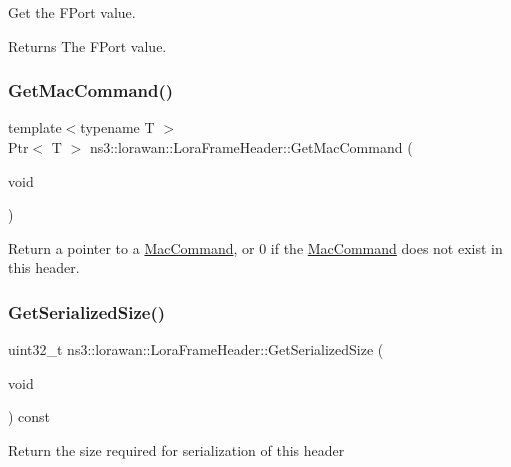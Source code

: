 Get the F\+Port value.

\begin{DoxyReturn}{Returns}
The F\+Port value. 
\end{DoxyReturn}
\mbox{\label{classns3_1_1lorawan_1_1LoraFrameHeader_acdb8505e2b4f1dc3d94fd33b3213ff46}} 
\subsubsection{\texorpdfstring{Get\+Mac\+Command()}{GetMacCommand()}}
{\footnotesize\ttfamily template$<$typename T $>$ \\
Ptr$<$ T $>$ ns3\+::lorawan\+::\+Lora\+Frame\+Header\+::\+Get\+Mac\+Command (\begin{DoxyParamCaption}\item[{void}]{ }\end{DoxyParamCaption})}

Return a pointer to a \hyperlink{classns3_1_1lorawan_1_1MacCommand}{Mac\+Command}, or 0 if the \hyperlink{classns3_1_1lorawan_1_1MacCommand}{Mac\+Command} does not exist in this header. \mbox{\label{classns3_1_1lorawan_1_1LoraFrameHeader_afa018a888ac159129f4ec309ff1c27fa}} 
\subsubsection{\texorpdfstring{Get\+Serialized\+Size()}{GetSerializedSize()}}
{\footnotesize\ttfamily uint32\+\_\+t ns3\+::lorawan\+::\+Lora\+Frame\+Header\+::\+Get\+Serialized\+Size (\begin{DoxyParamCaption}\item[{void}]{ }\end{DoxyParamCaption}) const\hspace{0.3cm}{\ttfamily [virtual]}}

Return the size required for serialization of this header

